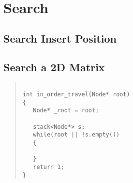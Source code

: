 \chapter{Search}\label{chp:Search}

\section{Search Insert Position}

\section{Search a 2D Matrix}


\begin{quote}
\begin{verbatim}

int in_order_travel(Node* root)
{
   Node* _root = root;
   
   stack<Node*> s;
   while(root || !s.empty())
   {
   
   }
   return 1;
}

\end{verbatim}
\end{quote}


